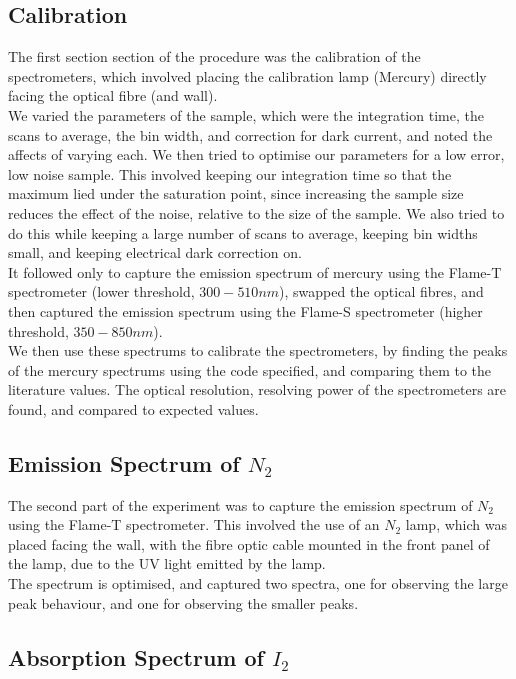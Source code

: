 \documentclass{article}
\begin{document}
\subsection{Calibration}
The first section section of the procedure was the calibration of the spectrometers, which involved placing the calibration lamp (Mercury) directly facing the optical fibre (and wall).\\
\indent We varied the parameters of the sample, which were the integration time, the scans to average, the bin width, and correction for dark current, and noted the affects of varying each. We then tried to optimise our parameters for a low error, low noise sample. This involved keeping our integration time so that the maximum lied under the saturation point, since increasing the sample size reduces the effect of the noise, relative to the size of the sample. We also tried to do this while keeping a large number of scans to average, keeping bin widths small, and keeping electrical dark correction on.\\
\indent It followed only to capture the emission spectrum of mercury using the Flame-T spectrometer (lower threshold, $300-510nm$), swapped the optical fibres, and then captured the emission spectrum using the Flame-S spectrometer (higher threshold, $350-850nm$).\\
\indent We then use these spectrums to calibrate the spectrometers, by finding the peaks of the mercury spectrums using the code specified, and comparing them to the literature values. The optical resolution, resolving power of the spectrometers are found, and compared to expected values.\\
\indent 
\subsection{Emission Spectrum of $N_2$}
The second part of the experiment was to capture the emission spectrum of $N_2$ using the Flame-T spectrometer. This involved the use of an $N_2$ lamp, which was placed facing the wall, with the fibre optic cable mounted in the front panel of the lamp, due to the UV light emitted by the lamp.\\
\indent The spectrum is optimised, and captured two spectra, one for observing the large peak behaviour, and one for observing the smaller peaks. 
\subsection{Absorption Spectrum of $I_2$}
\end{document}
